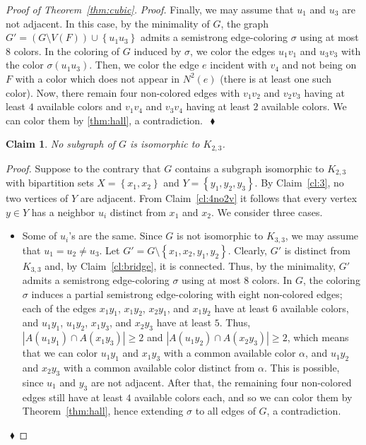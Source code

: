\documentclass[12pt,a4paper]{article}
\newtheorem{claim}{Claim}
\newcommand{\set}[1]{\ensuremath{\left\{#1 \right\}}}
\newenvironment{proofclaim}[1][]%
    {\noindent \emph{Proof.} {}{#1}{}}{$~$\hfill $~\blacklozenge$ \vspace{0.2cm}}
\begin{document}
\begin{proof}[Proof of Theorem~\ref{thm:cubic}]
\begin{proofclaim}
		Finally, we may assume that $u_1$ and $u_3$ are not adjacent.
		In this case, by the minimality of $G$, the graph $G' = (G \setminus V(F)) \cup \set{u_1u_3}$ admits a semistrong edge-coloring $\sigma$ using at most $8$ colors.
		In the coloring of $G$ induced by $\sigma$, we color the edges $u_1v_1$ and $u_3v_3$ with the color $\sigma(u_1u_3)$.
		Then, we color the edge $e$ incident with $v_4$ and not being on $F$ with a color which does not appear in $N^2(e)$ 
		(there is at least one such color).
		Now, there remain four non-colored edges with $v_1v_2$ and $v_2v_3$ having at least $4$ available colors
		and $v_1v_4$ and $v_3v_4$ having at least $2$ available colors. 
		We can color them by \cref{thm:hall}, a contradiction.
	\end{proofclaim}


	\begin{claim}
		\label{cl:K23}
		No subgraph of $G$ is isomorphic to $K_{2,3}$.
	\end{claim}
	
	\begin{proofclaim}
		Suppose to the contrary that $G$ contains a subgraph isomorphic to $K_{2,3}$ 
		with bipartition sets $X=\set{x_1,x_2}$ and $Y=\set{y_1,y_2,y_3}$. 
		By Claim~\ref{cl:3}, no two vertices of $Y$ are adjacent. 
		From Claim~\ref{cl:4no2v} it follows that every vertex $y \in Y$ has a neighbor $u_i$ distinct from $x_1$ and $x_2$. 		
		We consider three cases.

		\begin{itemize}
			\item[$(i)$] Some of $u_i$'s are the same. 
				Since $G$ is not isomorphic to $K_{3,3}$, 
				we may assume that $u_1=u_2 \ne u_3$.  
				Let $G'=G \setminus \set{x_1,x_2,y_1,y_2}$. 
				Clearly, $G'$ is distinct from $K_{3,3}$ and, by Claim~\ref{cl:bridge}, it is connected. 
				Thus, by the minimality, $G'$ admits a semistrong edge-coloring $\sigma$ using at most $8$ colors. 
				In $G$, the coloring $\sigma$ induces a partial semistrong edge-coloring with eight non-colored edges; 
				each of the edges $x_1y_1$, $x_1y_2$, $x_2y_1$, and $x_1y_2$ have at least $6$ available colors, 
				and $u_1y_1$, $u_1y_2$, $x_1y_3$, and $x_2y_3$ have at least $5$. 
				Thus, $|A(u_1y_1) \cap A(x_1y_3)| \ge 2$ and $|A(u_1y_2) \cap A(x_2y_3)| \ge 2$, 
				which means that we can color $u_1y_1$ and $x_1y_3$ with a common available color $\alpha$, 
				and $u_1y_2$ and $x_2y_3$ with a common available color distinct from $\alpha$. 
				This is possible, since $u_1$ and $y_3$ are not adjacent. 
				After that, the remaining four non-colored edges still have at least $4$ available colors each, 
				and so we can color them by Theorem~\ref{thm:hall}, hence extending $\sigma$ to all edges of $G$, a contradiction.
		

\end{itemize}
\end{proofclaim}
\end{proof}
\end{document}

